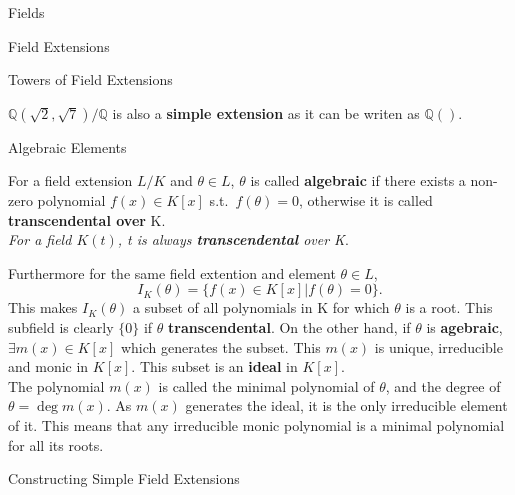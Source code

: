 \documentclass[12pt, letterpaper]{article}
\newcommand{\Q}{\mathbb{Q}}
\begin{document}
\begin{section}{Fields}
\begin{subsection}{Field Extensions}
\begin{subsubsection}{Towers of Field Extensions}
\begin{center}
      \end{center}
      \(\Q(\sqrt{2}, \sqrt{7}) / \Q\) is also a
      \textbf{simple extension} as it can be writen as \(\Q()\).

    \end{subsubsection}

  \end{subsection}

  \begin{subsection}{Algebraic Elements}

    For a field extension \(L / K\) and \(\theta \in L\), \(\theta\) is called
    \textbf{algebraic} if there exists a non-zero polynomial \(f(x) \in K[x]\)
    s.t.\ \(f(\theta) = 0\), otherwise it is called \textbf{transcendental
      over} K. \\
    \textit{For a field \(K(t)\), t is always \textbf{transcendental} over K}.

    Furthermore for the same field extention and element \(\theta \in L\),
    \[I_{K}(\theta) = \{f(x) \in K[x] | f(\theta) = 0\}.\] This makes
    \(I_{K}(\theta)\) a subset of all polynomials in K for which \(\theta\) is
    a root. This subfield is clearly \(\{ 0 \}\) if \(\theta\)
    \textbf{transcendental}. On the other hand, if \(\theta\) is
    \textbf{agebraic}, \(\exists m(x) \in K[x]\) which generates the subset.
    This \(m(x)\) is unique, irreducible and monic in \(K[x]\). This subset is
    an \textbf{ideal} in \(K[x]\). \\
    The polynomial \(m(x)\) is called the minimal polynomial of \(\theta\), and
    the degree of \(\theta = \deg m(x)\). As \(m(x)\) generates the ideal, it
    is the only irreducible element of it. This means that any irreducible
    monic polynomial is a minimal polynomial for all its roots.

  \end{subsection}

  \begin{subsection}{Constructing Simple Field Extensions}


\end{subsection}
\end{section}
\end{document}
